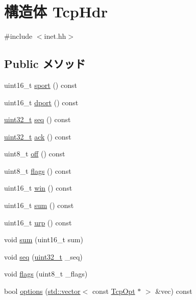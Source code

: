 \hypertarget{structNet_1_1TcpHdr}{
\section{構造体 TcpHdr}
\label{structNet_1_1TcpHdr}
}


{\ttfamily \#include $<$inet.hh$>$}\subsection*{Public メソッド}
\begin{DoxyCompactItemize}
\item 
uint16\_\-t \hyperlink{structNet_1_1TcpHdr_ac8b130feab6c3c849b62ee42ad32d6c2}{sport} () const 
\item 
uint16\_\-t \hyperlink{structNet_1_1TcpHdr_aba1e568ee57bc49dc901f0beb54a62af}{dport} () const 
\item 
\hyperlink{Type_8hh_a435d1572bf3f880d55459d9805097f62}{uint32\_\-t} \hyperlink{structNet_1_1TcpHdr_a049ec62f8a78c4e0a1ff4ed72d54efb1}{seq} () const 
\item 
\hyperlink{Type_8hh_a435d1572bf3f880d55459d9805097f62}{uint32\_\-t} \hyperlink{structNet_1_1TcpHdr_ac525b742fa49239d72c1a5b7171bbe69}{ack} () const 
\item 
uint8\_\-t \hyperlink{structNet_1_1TcpHdr_a3f7bd9781841d27d2dd7d69b8c666b34}{off} () const 
\item 
uint8\_\-t \hyperlink{structNet_1_1TcpHdr_a54191ca9612c1e21fbc7e3133792a809}{flags} () const 
\item 
uint16\_\-t \hyperlink{structNet_1_1TcpHdr_aada963d6f2ef1f4802bfe71a346bdc5e}{win} () const 
\item 
uint16\_\-t \hyperlink{structNet_1_1TcpHdr_acbf3c502c7393ef0178454b237b2562f}{sum} () const 
\item 
uint16\_\-t \hyperlink{structNet_1_1TcpHdr_ad713d66036461e2df776046f5f0a6fd1}{urp} () const 
\item 
void \hyperlink{structNet_1_1TcpHdr_ae0171ec0578adacce8cceb6a804f97f1}{sum} (uint16\_\-t sum)
\item 
void \hyperlink{structNet_1_1TcpHdr_abdc79019c979df22c7838608d8165b8e}{seq} (\hyperlink{Type_8hh_a435d1572bf3f880d55459d9805097f62}{uint32\_\-t} \_\-seq)
\item 
void \hyperlink{structNet_1_1TcpHdr_aeaeb21104a163e0151ec998def60ffad}{flags} (uint8\_\-t \_\-flags)
\item 
bool \hyperlink{structNet_1_1TcpHdr_ad42e4f03cdf97f26900594dc2c07c43f}{options} (\hyperlink{classstd_1_1vector}{std::vector}$<$ const \hyperlink{structNet_1_1TcpOpt}{TcpOpt} $\ast$ $>$ \&vec) const 

\end{DoxyCompactItemize}
